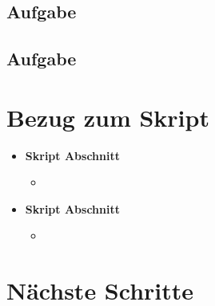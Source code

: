 \documentclass{article}
\begin{document}
\subsection{Aufgabe}


\subsection{Aufgabe}


\section{Bezug zum Skript}

\begin{itemize}
	\item \textbf{Skript Abschnitt}
		\begin{itemize}
			\item 
		\end{itemize}
	\item \textbf{Skript Abschnitt}
		\begin{itemize}
			\item 
		\end{itemize}
\end{itemize}
 
\section{Nächste Schritte}
\end{document}

